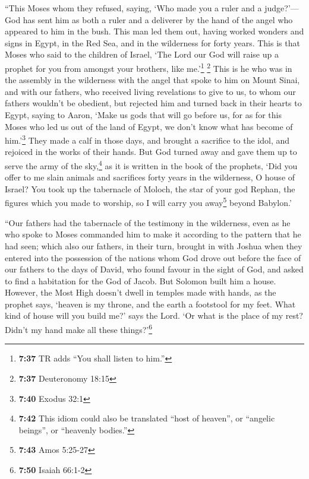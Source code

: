  ``This Moses whom they refused, saying, `Who made you a
ruler and a judge?'---God has sent him as both a ruler and a deliverer
by the hand of the angel who appeared to him in the bush.
 This man led them out, having worked wonders and signs
in Egypt, in the Red Sea, and in the wilderness for forty years.
 This is that Moses who said to the children of Israel,
`The Lord our God will raise up a prophet for you from amongst your
brothers, like me.'\footnote{\textbf{7:37} TR adds ``You shall listen to
  him.''} \footnote{\textbf{7:37} Deuteronomy 18:15} 
This is he who was in the assembly in the wilderness with the angel that
spoke to him on Mount Sinai, and with our fathers, who received living
revelations to give to us,  to whom our fathers wouldn't
be obedient, but rejected him and turned back in their hearts to Egypt,
 saying to Aaron, `Make us gods that will go before us,
for as for this Moses who led us out of the land of Egypt, we don't know
what has become of him.'\footnote{\textbf{7:40} Exodus 32:1}
 They made a calf in those days, and brought a sacrifice
to the idol, and rejoiced in the works of their hands. 
But God turned away and gave them up to serve the army of the
sky,\footnote{\textbf{7:42} This idiom could also be translated ``host
  of heaven'', or ``angelic beings'', or ``heavenly bodies.''} as it is
written in the book of the prophets, `Did you offer to me slain animals
and sacrifices forty years in the wilderness, O house of Israel?
 You took up the tabernacle of Moloch, the star of your
god Rephan, the figures which you made to worship, so I will carry you
away\footnote{\textbf{7:43} Amos 5:25-27} beyond Babylon.'

 ``Our fathers had the tabernacle of the testimony in the
wilderness, even as he who spoke to Moses commanded him to make it
according to the pattern that he had seen;  which also
our fathers, in their turn, brought in with Joshua when they entered
into the possession of the nations whom God drove out before the face of
our fathers to the days of David,  who found favour in
the sight of God, and asked to find a habitation for the God of Jacob.
 But Solomon built him a house.  However,
the Most High doesn't dwell in temples made with hands, as the prophet
says,  `heaven is my throne, and the earth a footstool
for my feet. What kind of house will you build me?' says the Lord. `Or
what is the place of my rest?  Didn't my hand make all
these things?'\footnote{\textbf{7:50} Isaiah 66:1-2}

